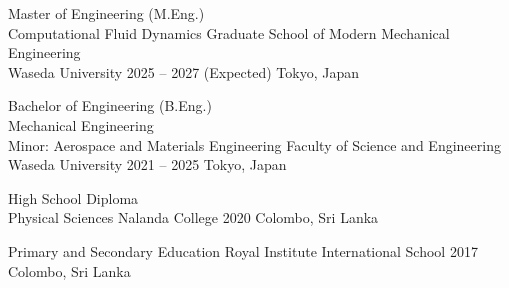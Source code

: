 
\EducationSection

\Education
{Master of Engineering (M.Eng.)\\
Computational Fluid Dynamics}
{Graduate School of Modern Mechanical Engineering\\
Waseda University}
{2025 -- 2027 (Expected)}
{Tokyo, Japan}

\vspace{0.10cm}

\Education
{Bachelor of Engineering (B.Eng.)\\
Mechanical Engineering\\
Minor: Aerospace and Materials Engineering}
{Faculty of Science and Engineering\\
Waseda University}
{2021 -- 2025}
{Tokyo, Japan}

\vspace{0.10cm}

\Education
{High School Diploma\\
Physical Sciences}
{Nalanda College}
{2020}
{Colombo, Sri Lanka}

\vspace{0.10cm}

\Education
{Primary and Secondary Education}
{Royal Institute International School}
{2017}
{Colombo, Sri Lanka}
